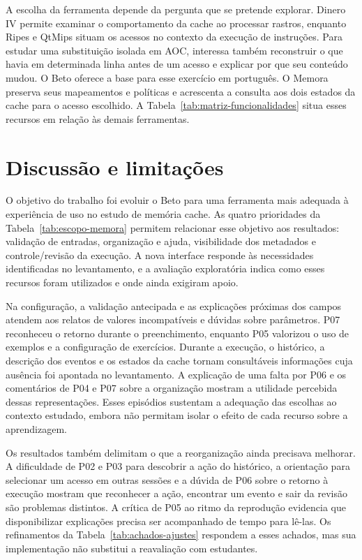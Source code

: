 \documentclass[article,12pt,oneside,a4paper,english,brazil]{abntex2}
\begin{document}
A escolha da ferramenta depende da pergunta que se pretende explorar. Dinero IV permite examinar o comportamento da cache ao processar rastros, enquanto Ripes e QtMips situam os acessos no contexto da execução de instruções. Para estudar uma substituição isolada em AOC, interessa também reconstruir o que havia em determinada linha antes de um acesso e explicar por que seu conteúdo mudou. O Beto oferece a base para esse exercício em português. O Memora preserva seus mapeamentos e políticas e acrescenta a consulta aos dois estados da cache para o acesso escolhido. A Tabela~\ref{tab:matriz-funcionalidades} situa esses recursos em relação às demais ferramentas.

\FloatBarrier

\FloatBarrier

\FloatBarrier

\FloatBarrier

\FloatBarrier
{}
\section{Discussão e limitações}
\label{sec:discussao}

O objetivo do trabalho foi evoluir o Beto para uma ferramenta mais adequada à experiência de uso no estudo de memória cache. As quatro prioridades da Tabela~\ref{tab:escopo-memora} permitem relacionar esse objetivo aos resultados: validação de entradas, organização e ajuda, visibilidade dos metadados e controle/revisão da execução. A nova interface responde às necessidades identificadas no levantamento, e a avaliação exploratória indica como esses recursos foram utilizados e onde ainda exigiram apoio.

Na configuração, a validação antecipada e as explicações próximas dos campos atendem aos relatos de valores incompatíveis e dúvidas sobre parâmetros. P07 reconheceu o retorno durante o preenchimento, enquanto P05 valorizou o uso de exemplos e a configuração de exercícios. Durante a execução, o histórico, a descrição dos eventos e os estados da cache tornam consultáveis informações cuja ausência foi apontada no levantamento. A explicação de uma falta por P06 e os comentários de P04 e P07 sobre a organização mostram a utilidade percebida dessas representações. Esses episódios sustentam a adequação das escolhas ao contexto estudado, embora não permitam isolar o efeito de cada recurso sobre a aprendizagem.

Os resultados também delimitam o que a reorganização ainda precisava melhorar. A dificuldade de P02 e P03 para descobrir a ação do histórico, a orientação para selecionar um acesso em outras sessões e a dúvida de P06 sobre o retorno à execução mostram que reconhecer a ação, encontrar um evento e sair da revisão são problemas distintos. A crítica de P05 ao ritmo da reprodução evidencia que disponibilizar explicações precisa ser acompanhado de tempo para lê-las. Os refinamentos da Tabela~\ref{tab:achados-ajustes} respondem a esses achados, mas sua implementação não substitui a reavaliação com estudantes.
\end{document}
